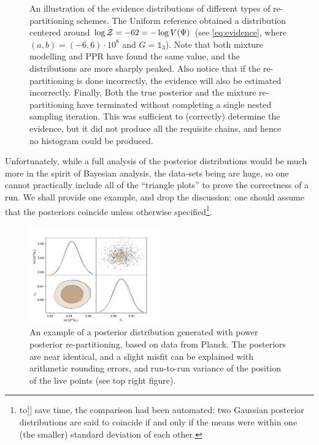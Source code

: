 \documentclass[usenatbib]{mnras}
\begin{document}
\begin{figure}

\caption{\label{orgcd3afc3}
An illustration of the evidence distributions of different types of re-partitioning schemes. The Uniform reference obtained a distribution centered around \(\log {\cal Z} = -62 = - \log V(\Psi)\) (see \autoref{eq:evidence}, where \((a,b)=(-6, 6)\cdot 10^{8}\) and \(G=\mathds{1}_{3}\)). Note that both mixture modelling and PPR have found the same value, and the distributions are more sharply peaked. Also notice that if the re-partitioning is done incorrectly, the evidence will also be estimated incorrectly. Finally, Both the true posterior and the mixture re-partitioning have terminated without completing a single nested sampling iteration. This was sufficient to (correctly) determine the evidence, but it did not produce all the requisite chains, and hence no histogram could be produced.}
\end{figure}

Unfortunately, while a full analysis of the posterior distributions
would be much more in the spirit of Bayesian analysis, the data-sets
being are huge, so one cannot practically include all of
the ``triangle plots'' to prove the correctness of a run. We shall
provide one example, and drop the discussion: one should assume
that the posteriors coincide unless otherwise specified\footnote{to]] save time, the comparison had been automated: two Gaussian
posterior distributions are said to coincide if and only if the means
were within one (the smaller) standard deviation  of each
other.}. 

\begin{figure}
 \includegraphics[width=0.5\textwidth]{./illustrations/misfit.pdf}
\caption{\label{org440a7e1}
An example of a posterior distribution generated with power posterior re-partitioning, based on data from Planck. The posteriors are near identical, and a slight misfit can be explained with arithmetic rounding errors, and run-to-run variance of the position of the live points (see top right figure).}
\end{figure}
\end{document}
